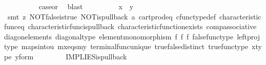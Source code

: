 \begin{isabellebody}
\ \ \ \ \ \ \ \ \isamarkupfalse%
\ case{}{\isacharunderscore}{\kern0pt}or{\isacharunderscore}{\kern0pt}{}\ \isamarkupfalse%
\ blast\isanewline
\ \ \ \ \ \ \isamarkupfalse%
\ \isamarkupfalse%
\ {\isachardoublequoteopen}x\ {\isacharequal}{\kern0pt}\ y{\isachardoublequoteclose}\isanewline
\ \ \ \ \ \ \ \ \isamarkupfalse%
\ {\isacharparenleft}{\kern0pt}smt\ {\isacharparenleft}{\kern0pt}z{}{\isacharparenright}{\kern0pt}\ NOT{\isacharunderscore}{\kern0pt}false{\isacharunderscore}{\kern0pt}is{\isacharunderscore}{\kern0pt}true\ NOT{\isacharunderscore}{\kern0pt}is{\isacharunderscore}{\kern0pt}pullback\ a{}\ cart{\isacharunderscore}{\kern0pt}prod{\isacharunderscore}{\kern0pt}eq{}\ cfunc{\isacharunderscore}{\kern0pt}type{\isacharunderscore}{\kern0pt}def\ characteristic{\isacharunderscore}{\kern0pt}func{\isacharunderscore}{\kern0pt}eq\ characteristic{\isacharunderscore}{\kern0pt}func{\isacharunderscore}{\kern0pt}is{\isacharunderscore}{\kern0pt}pullback\ characteristic{\isacharunderscore}{\kern0pt}function{\isacharunderscore}{\kern0pt}exists\ comp{\isacharunderscore}{\kern0pt}associative\ diag{\isacharunderscore}{\kern0pt}on{\isacharunderscore}{\kern0pt}elements\ diagonal{\isacharunderscore}{\kern0pt}type\ element{\isacharunderscore}{\kern0pt}monomorphism\ f{}\ f{}\ f{}\ false{\isacharunderscore}{\kern0pt}func{\isacharunderscore}{\kern0pt}type\ left{\isacharunderscore}{\kern0pt}proj{\isacharunderscore}{\kern0pt}type\ maps{\isacharunderscore}{\kern0pt}into{\isacharunderscore}{\kern0pt}{}u{}\ mx{\isacharunderscore}{\kern0pt}eqs{\isacharunderscore}{\kern0pt}my\ terminal{\isacharunderscore}{\kern0pt}func{\isacharunderscore}{\kern0pt}unique\ true{\isacharunderscore}{\kern0pt}false{\isacharunderscore}{\kern0pt}distinct\ true{\isacharunderscore}{\kern0pt}func{\isacharunderscore}{\kern0pt}type\ x{\isacharunderscore}{\kern0pt}type\ y{\isacharunderscore}{\kern0pt}form{\isacharparenright}{\kern0pt}\isanewline
\ \ \ \ \isamarkupfalse%
\isanewline
\ \ \isamarkupfalse%
\isanewline
{}\isamarkupfalse%
%
\endisatagproof
{\isafoldproof}%
%
\isadelimproof
\isanewline
%
\endisadelimproof
\isanewline
{}\isamarkupfalse%
\ IMPLIES{\isacharunderscore}{\kern0pt}is{\isacharunderscore}{\kern0pt}pullback{\isacharcolon}{\kern0pt}\isanewline

\end{isabellebody}
